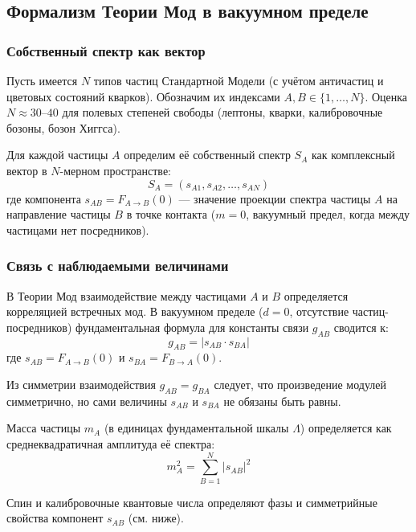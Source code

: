 \documentclass[12pt,a4paper]{article}
\begin{document}
\subsection{Формализм Теории Мод в вакуумном пределе}

\subsubsection{Собственный спектр как вектор}
Пусть имеется $N$ типов частиц Стандартной Модели (с учётом античастиц и цветовых состояний кварков). Обозначим их индексами $A, B \in \{1, \dots, N\}$. Оценка $N \approx 30$--$40$ для полевых степеней свободы (лептоны, кварки, калибровочные бозоны, бозон Хиггса).

Для каждой частицы $A$ определим её собственный спектр $S_A$ как комплексный вектор в $N$-мерном пространстве:
\begin{equation}
    S_A = (s_{A1}, s_{A2}, \dots, s_{AN})
\end{equation}
где компонента $s_{AB} = F_{A \to B}(0)$ --- значение проекции спектра частицы $A$ на направление частицы $B$ в точке контакта ($m = 0$, вакуумный предел, когда между частицами нет посредников).

\subsubsection{Связь с наблюдаемыми величинами}
В Теории Мод взаимодействие между частицами $A$ и $B$ определяется корреляцией встречных мод. В вакуумном пределе ($d = 0$, отсутствие частиц-посредников) фундаментальная формула для константы связи $g_{AB}$ сводится к:
\begin{equation}
    g_{AB} = |s_{AB} \cdot s_{BA}|
\end{equation}
где $s_{AB} = F_{A \to B}(0)$ и $s_{BA} = F_{B \to A}(0)$.

Из симметрии взаимодействия $g_{AB} = g_{BA}$ следует, что произведение модулей симметрично, но сами величины $s_{AB}$ и $s_{BA}$ не обязаны быть равны.

Масса частицы $m_A$ (в единицах фундаментальной шкалы $\Lambda$) определяется как среднеквадратичная амплитуда её спектра:
\begin{equation}
    m_A^2 = \sum_{B=1}^{N} |s_{AB}|^2
\end{equation}

Спин и калибровочные квантовые числа определяют фазы и симметрийные свойства компонент $s_{AB}$ (см. ниже).
\end{document}
